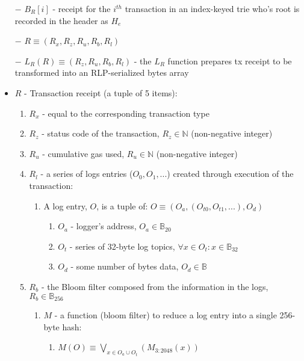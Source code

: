 \documentclass{article}
\begin{document}
\begin{itemize}
    \item[$-$] $B_R[i]$ - receipt for the $i^{th}$  transaction in an index-keyed trie who's root is recorded in the header as $H_e$
    \item[$-$] $R  \equiv (R_x, R_z, R_u, R_b, R_l)$
    \item[$-$] $L_R(R) \equiv (R_z, R_u, R_b, R_l)$ - the $L_R$ function prepares tx receipt to be transformed into an RLP-serialized bytes array
    \item $R$ - Transaction receipt (a tuple of 5 items):

    \begin{enumerate}
        \item $R_x$ - equal to the corresponding transaction type
        \item $R_z$ - status code of the transaction, $R_z \in \mathbb{N}$ (non-negative integer)
        \item $R_u$ - cumulative gas used, $R_u \in \mathbb{N}$ (non-negative integer)
        \item $R_l$ - a series of logs entries ($O_0, O_1,...$) created through execution of the transaction:
        \begin{enumerate}
            \item A log entry, $O$, is a tuple of: $O \equiv (O_a, (O_{t0}, O_{t1},...), O_d)$ 
            \begin{enumerate}
                \item $O_a$ - logger's  address,  $O_a \in \mathbb{B}_{20}$ 
                \item $O_t$ - series of 32-byte log topics, $\forall x \in O_t : x \in \mathbb{B}_{32}$
                \item $O_d$ - some number of bytes data, $O_d \in \mathbb{B}$
            \end{enumerate}
        \end{enumerate}
        \item $R_b$ - the Bloom filter composed from the information in the logs, $R_b \in \mathbb{B}_{256}$
        \begin{enumerate}
            \item $M$ - a function (bloom filter) to reduce a log entry into a single 256-byte hash:
            \begin{enumerate}
                \item $M(O) \equiv \bigvee _{x \in {O_a}\cup O_t}(M_{3:2048}(x))$
                \begin{enumerate}

\end{enumerate}
\end{enumerate}
\end{enumerate}
\end{enumerate}
\end{itemize}
\end{document}
